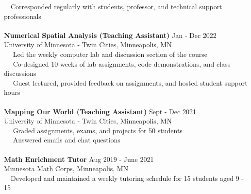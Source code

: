 \documentclass[letterpaper,12pt]{article}
\numberwithin{equation}{section}
\begin{document}
 \hspace*{1.2in} \textbullet ~~Corresponded regularly with students, professor, and technical support professionals\\
 \\
 \hspace*{1.16in} \textbf{Numerical Spatial Analysis (Teaching Assistant)} \hspace*{1.2in} Jan - Dec 2022\\
 \hspace*{1.16in} University of Minnesota - Twin Cities, Minneapolis, MN \vspace*{.1cm}\\
 \hspace*{1.2in} \textbullet ~~ Led the weekly computer lab and discussion section of the course\\
 \hspace*{1.2in} \textbullet ~~ Co-designed 10 weeks of lab assignments, code demonstrations, and class discussions\\
 \hspace*{1.2in} \textbullet ~~ Guest lectured, provided feedback on assignments, and hosted student support hours
\\\\
 \hspace*{1.16in} \textbf{Mapping Our World (Teaching Assistant)} \hspace*{1.7in} Sept - Dec 2021\\
 \hspace*{1.16in} University of Minnesota - Twin Cities, Minneapolis, MN \vspace*{.1cm}\\
 \hspace*{1.2in} \textbullet ~~ Graded assignments, exams, and projects for 50 students\\
 \hspace*{1.2in} \textbullet ~~ Answered emails and chat questions
\\\\
\hspace*{1.16in}\textbf{Math Enrichment Tutor} \hspace*{2.85in} Aug 2019 - June 2021\\	
\hspace*{1.16in} Minnesota Math Corps, Minneapolis, MN \vspace*{.1cm} \\
\hspace*{1.2in} \textbullet ~~Developed and maintained a weekly tutoring schedule for 15 students aged 9 - 15 \\
\end{document}

